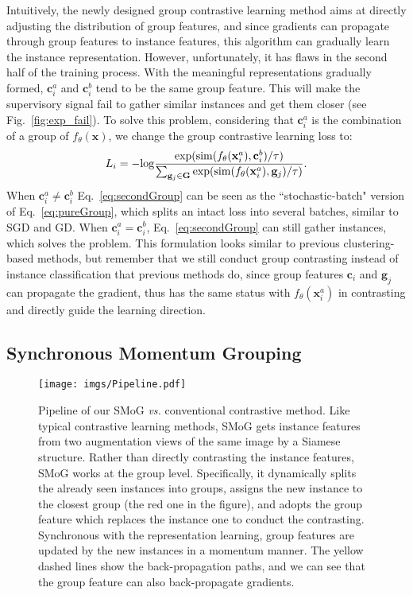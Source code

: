 \documentclass[runningheads]{style/llncs}
\begin{document}
Intuitively, the newly designed group contrastive learning method aims at directly adjusting the distribution of group features, and since gradients can propagate through group features to instance features, this algorithm can gradually learn the instance representation. However, unfortunately, it has flaws in the second half of the training process. With the meaningful representations gradually formed, $\mathbf{c}_i^a$ and $\mathbf{c}_i^b$ tend to be the same group feature. This will make the supervisory signal fail to gather similar instances and get them closer (see Fig.~\ref{fig:exp_fail}). To solve this problem, considering that $\mathbf{c}_i^a$ is the combination of a group of $f_\theta(\mathbf{x})$, we change the group contrastive learning loss to:
\begin{equation}
L_i = -{\rm log}\frac{{\rm exp}({\rm sim}(f_\theta(\mathbf{x}_i^a), \mathbf{c}_i^b)/\tau)}{\sum_{\mathbf{g}_j \in \mathbf{G}}{\rm exp}({\rm sim}(f_\theta(\mathbf{x}_i^a), \mathbf{g}_j)/\tau)}.
\label{eq:secondGroup}
\end{equation}
When $\mathbf{c}_i^a \neq \mathbf{c}_i^b$ Eq.~\ref{eq:secondGroup} can be seen as the ``stochastic-batch" version of Eq.~\ref{eq:pureGroup}, which splits an intact loss into several batches, similar to SGD and GD. When $\mathbf{c}_i^a = \mathbf{c}_i^b$, Eq.~\ref{eq:secondGroup} can still gather instances, which solves the problem. This formulation looks similar to previous clustering-based methods, but remember that we still conduct group contrasting instead of instance classification that previous methods do, since group features $\mathbf{c}_i$ and $ \mathbf{g}_j$ can propagate the gradient, thus has the same status with $f_\theta(\mathbf{x}_i^a)$ in contrasting and directly guide the learning direction.
 

\subsection{Synchronous Momentum Grouping}

\begin{figure}[t]
	\begin{center}
		\texttt{[image: imgs/Pipeline.pdf]}
	\end{center}
	\caption{Pipeline of our SMoG \textit{vs.} conventional contrastive method. Like typical contrastive learning methods, SMoG gets instance features from two augmentation views of the same image by a Siamese structure. Rather than directly contrasting the instance features, SMoG works at the group level. Specifically, it dynamically splits the already seen instances into groups, assigns the new instance to the closest group (the red one in the figure), and adopts the group feature which replaces the instance one to conduct the contrasting. Synchronous with the representation learning, group features are updated by the new instances in a momentum manner. The yellow dashed lines show the back-propagation paths, and we can see that the group feature can also back-propagate gradients.} 
	\label{fig:pipeline}
\end{figure}
\end{document}
